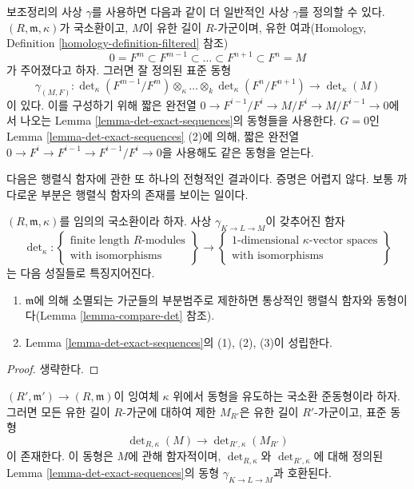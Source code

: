 \noindent
보조정리의 사상 $\gamma$를 사용하면 다음과 같이 더 일반적인 사상
$\gamma$를 정의할 수 있다. $(R, \mathfrak m, \kappa)$가 국소환이고,
$M$이 유한 길이 $R$-가군이며, 유한 여과(Homology, Definition
\ref{homology-definition-filtered} 참조)
$$
0 = F^m \subset F^{m - 1} \subset \ldots \subset F^{n + 1} \subset F^n = M
$$
가 주어졌다고 하자. 그러면 잘 정의된 표준 동형
$$
\gamma_{(M, F)} :
\det\nolimits_\kappa(F^{m - 1}/F^m) \otimes_\kappa \ldots \otimes_k 
\det\nolimits_\kappa(F^n/F^{n + 1})
\longrightarrow
\det\nolimits_\kappa(M)
$$
이 있다. 이를 구성하기 위해 짧은 완전열
$0 \to F^{i - 1}/F^i \to M/F^i \to M/F^{i - 1} \to 0$에서 나오는
Lemma \ref{lemma-det-exact-sequences}의 동형들을 사용한다. $G = 0$인
Lemma \ref{lemma-det-exact-sequences} (2)에 의해, 짧은 완전열
$0 \to F^i \to F^{i - 1} \to F^{i - 1}/F^i \to 0$을 사용해도 같은
동형을 얻는다.

\medskip\noindent
다음은 행렬식 함자에 관한 또 하나의 전형적인 결과이다. 증명은 어렵지
않다. 보통 까다로운 부분은 행렬식 함자의 존재를 보이는 일이다.

\begin{lemma}
\label{lemma-uniqueness-det}
$(R, \mathfrak m, \kappa)$를 임의의 국소환이라 하자. 사상
$\gamma_{K \to L \to M}$이 갖추어진 함자
$$
\det\nolimits_\kappa :
\left\{
\begin{matrix}
\text{finite length }R\text{-modules} \\
\text{with isomorphisms}
\end{matrix}
\right\}
\longrightarrow
\left\{
\begin{matrix}
1\text{-dimensional }\kappa\text{-vector spaces} \\
\text{with isomorphisms}
\end{matrix}
\right\}
$$
는 다음 성질들로 특징지어진다.
\begin{enumerate}
\item $\mathfrak m$에 의해 소멸되는 가군들의 부분범주로 제한하면
통상적인 행렬식 함자와 동형이다(Lemma \ref{lemma-compare-det} 참조).
\item Lemma \ref{lemma-det-exact-sequences}의 (1), (2), (3)이 성립한다.
\end{enumerate}
\end{lemma}

\begin{proof}
생략한다.
\end{proof}

\begin{lemma}
\label{lemma-determinant-quotient-ring}
$(R', \mathfrak m') \to (R, \mathfrak m)$이 잉여체 $\kappa$ 위에서
동형을 유도하는 국소환 준동형이라 하자. 그러면 모든 유한 길이
$R$-가군에 대하여 제한 $M_{R'}$은 유한 길이 $R'$-가군이고, 표준 동형
$$
\det\nolimits_{R, \kappa}(M)
\longrightarrow
\det\nolimits_{R', \kappa}(M_{R'})
$$
이 존재한다. 이 동형은 $M$에 관해 함자적이며, $\det_{R, \kappa}$와
$\det_{R', \kappa}$에 대해 정의된 Lemma
\ref{lemma-det-exact-sequences}의 동형 $\gamma_{K \to L \to M}$과
호환된다.
\end{lemma}

